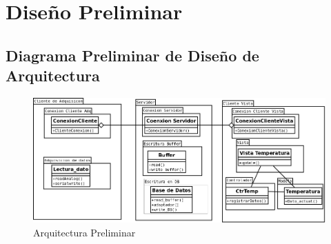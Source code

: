 %
%

\newpage
\section{\textcolor[gray]{.2}{Diseño Preliminar}}
\subsection{\textcolor[gray]{.2}{Diagrama Preliminar de Diseño de Arquitectura}}
\begin{figure}[h!]
 \begin{center}
  \includegraphics[width=1\textwidth,keepaspectratio=true]{./img/arqprelim.png}
  \caption{Arquitectura Preliminar}
  \label{fig:esquema}
 \end{center}
\end{figure}

